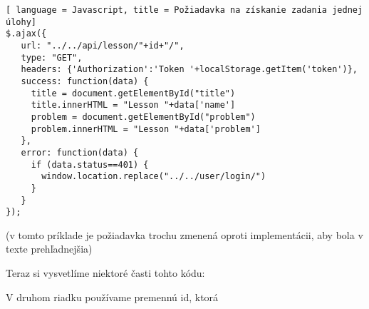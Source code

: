 \begin{lstlisting}[ language = Javascript, title = Požiadavka na získanie zadania jednej úlohy]
$.ajax({
   url: "../../api/lesson/"+id+"/",
   type: "GET",
   headers: {'Authorization':'Token '+localStorage.getItem('token')},
   success: function(data) {
     title = document.getElementById("title")
     title.innerHTML = "Lesson "+data['name']
     problem = document.getElementById("problem")
     problem.innerHTML = "Lesson "+data['problem']
   },
   error: function(data) {
     if (data.status==401) {
       window.location.replace("../../user/login/")
     }
   }
});
\end{lstlisting}
(v tomto príklade je požiadavka trochu zmenená oproti implementácii, aby bola v texte
prehľadnejšia)


Teraz si vysvetlíme niektoré časti tohto kódu:

V druhom riadku používame premennú id, ktorá
